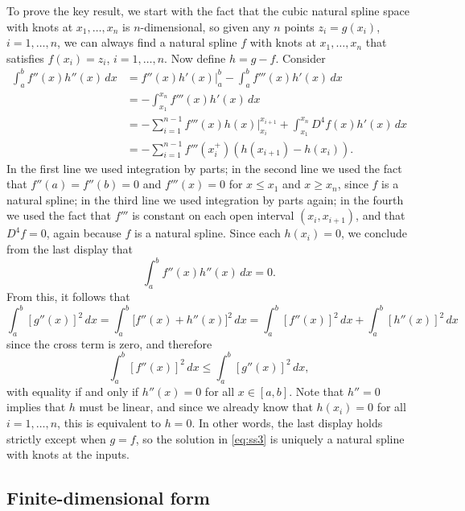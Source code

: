 \documentclass{article}
\begin{document}
To prove the key result, we start with the fact that the cubic natural spline
space with knots at $x_1,\dots,x_n$ is $n$-dimensional, so given any $n$ points
$z_i = g(x_i)$, $i=1,\dots,n$, we can always find a natural spline $f$ with
knots at $x_1,\dots,x_n$ that satisfies $f(x_i) = z_i$, $i=1,\dots,n$. Now
define $h = g-f$. Consider
\begin{align*}
\int_a^b f''(x) h''(x) \, dx 
&= f''(x) h'(x) \Big|_a^b - \int_a^b f'''(x) h'(x) \, dx \\
&= -\int_{x_1}^{x_n} f'''(x) h'(x) \, dx \\ 
&= -\sum_{i=1}^{n-1} f'''(x) h(x) \Big|_{x_i}^{x_{i+1}} +  
\int_{x_1}^{x_n} D^4 f(x) h'(x) \, dx \\
&= -\sum_{i=1}^{n-1} f'''(x_i^+) (h(x_{i+1}) - h(x_i)).
\end{align*}
In the first line we used integration by parts; in the second line we used the
fact that $f''(a) = f''(b) = 0$ and $f'''(x)=0$ for $x \leq x_1$ and $x \geq
x_n$, since $f$ is a natural spline; in the third line we used integration by
parts again; in the fourth we used the fact that $f'''$ is constant on each open
interval $(x_i,x_{i+1})$, and that $D^4 f=0$, again because $f$ is a natural
spline. Since each $h(x_i)=0$, we conclude from the last display that
\[
\int_a^b f''(x) h''(x) \, dx = 0.
\]
From this, it follows that
\[
\int_a^b [g''(x)]^2 \, dx 
= \int_a^b \big[ f''(x) + h''(x) \big]^2 \, dx 
= \int_a^b [f''(x)]^2 \, dx + \int_a^b [h''(x)]^2 \, dx
\]
since the cross term is zero, and therefore 
\[
\int_a^b [f''(x)]^2 \, dx \leq \int_a^b [g''(x)]^2 \, dx,
\]
with equality if and only if $h''(x)=0$ for all $x \in [a,b]$. Note that $h''=0$
implies that $h$ must be linear, and since we already know that $h(x_i)=0$ for
all $i=1,\dots,n$, this is equivalent to $h=0$. In other words, the last display
holds strictly except when $g=f$, so the solution in \eqref{eq:ss3} is uniquely
a natural spline with knots at the inputs. 

\subsection{Finite-dimensional form}
\end{document}
